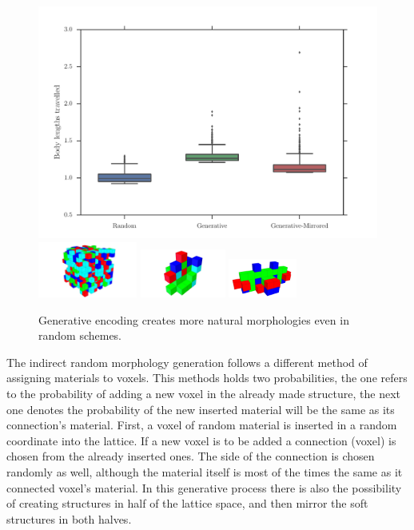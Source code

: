 \begin{figure}
\centering
\includegraphics[width=1.0\textwidth]{../Figures/Results/random.pdf}\\
\hspace{0.1cm}
\includegraphics[width=0.29\textwidth]{../Figures/Robots/random.jpg}
\includegraphics[width=0.25\textwidth]{../Figures/Robots/rg0.jpg}
\includegraphics[width=0.20\textwidth]{../Figures/Robots/rg1.jpg}
\caption{Generative encoding creates more natural morphologies even in random schemes.}
\label{fig:randomResultsRobots}
\end{figure}


The indirect random morphology generation follows a different method of assigning materials to voxels. This methods holds two probabilities, the one refers to the probability of adding a new voxel in the already made structure, the next one denotes the probability of the new inserted material will be the same as its connection's material. First, a voxel of random material is inserted in a random coordinate into the lattice. If a new voxel is to be added a connection (voxel) is chosen from the already inserted ones. The side of the connection is chosen randomly as well, although the material itself is most of the times the same as it connected voxel's material. In this generative process there is also the possibility of creating structures in half of the lattice space, and then mirror the soft structures in both halves.

